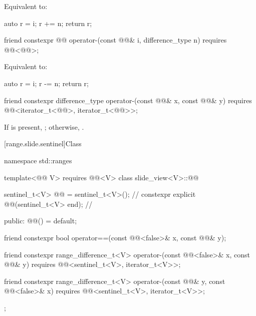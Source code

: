 \begin{itemdescr}
\pnum
\effects
Equivalent to:
\begin{codeblock}
auto r = i;
r += n;
return r;
\end{codeblock}
\end{itemdescr}

%
\begin{itemdecl}
friend constexpr @@ operator-(const @@& i, difference_type n)
  requires @@<@@>;
\end{itemdecl}

\begin{itemdescr}
\pnum
\effects
Equivalent to:
\begin{codeblock}
auto r = i;
r -= n;
return r;
\end{codeblock}
\end{itemdescr}

%
\begin{itemdecl}
friend constexpr difference_type operator-(const @@& x, const @@& y)
  requires @@<iterator_t<@@>, iterator_t<@@>>;
\end{itemdecl}

\begin{itemdescr}
\pnum
\returns
If  is present,
;
otherwise, .
\end{itemdescr}

[range.slide.sentinel]{Class }

%
\begin{codeblock}
namespace std::ranges {
  template<@@ V>
    requires @@<V>
  class slide_view<V>::@@ {
    sentinel_t<V> @@ = sentinel_t<V>();             // \expos
    constexpr explicit @@(sentinel_t<V> end);   // \expos

  public:
    @@() = default;

    friend constexpr bool operator==(const @@<false>& x, const @@& y);

    friend constexpr range_difference_t<V>
      operator-(const @@<false>& x, const @@& y)
        requires @@<sentinel_t<V>, iterator_t<V>>;

    friend constexpr range_difference_t<V>
      operator-(const @@& y, const @@<false>& x)
        requires @@<sentinel_t<V>, iterator_t<V>>;
  };
}
\end{codeblock}

